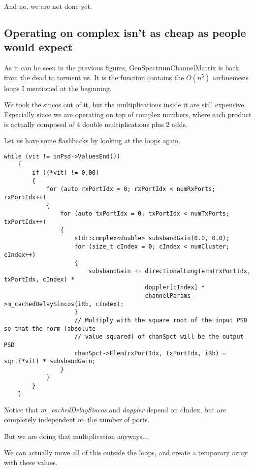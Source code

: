 \documentclass{article}
\begin{document}
And no, we are not done yet.

\subsection{Operating on complex isn't as cheap as people would expect}

As it can be seen in the previous figures, GenSpectrumChannelMatrix is back
from the dead to torment us. It is the function contains the $O(n^5)$
archnemesis loops I mentioned at the beginning.

We took the sincos out of it, but the multiplications inside it are still
expensive. Especially since we are operating on top of complex numbers,
where each product is actually composed of 4 double multiplications plus 2 adds.

Let us have some flashbacks by looking at the loops again.

\begin{lstlisting}
while (vit != inPsd->ValuesEnd())
    {
        if ((*vit) != 0.00)
        {
            for (auto rxPortIdx = 0; rxPortIdx < numRxPorts; rxPortIdx++)
            {
                for (auto txPortIdx = 0; txPortIdx < numTxPorts; txPortIdx++)
                {
                    std::complex<double> subsbandGain(0.0, 0.0);
                    for (size_t cIndex = 0; cIndex < numCluster; cIndex++)
                    {
                        subsbandGain += directionalLongTerm(rxPortIdx, txPortIdx, cIndex) *
                                        doppler[cIndex] *
                                        channelParams->m_cachedDelaySincos(iRb, cIndex);
                    }
                    // Multiply with the square root of the input PSD so that the norm (absolute
                    // value squared) of chanSpct will be the output PSD
                    chanSpct->Elem(rxPortIdx, txPortIdx, iRb) = sqrt(*vit) * subsbandGain;
                }
            }
        }
    }
\end{lstlisting}

Notice that \emph{m\_cachedDelaySincos} and \emph{doppler} depend on cIndex,
but are completely independent on the number of ports.

But we are doing that multiplication anyways...

We can actually move all of this outside the loops, and create a temporary
array with these values.
\end{document}
